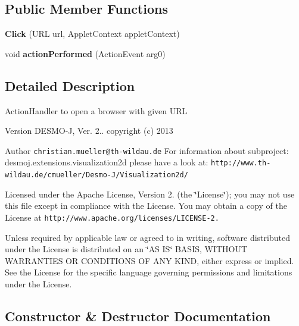 \subsection*{Public Member Functions}
\begin{DoxyCompactItemize}
\item 
{\bf Click} (U\-R\-L url, Applet\-Context applet\-Context)
\item 
void {\bfseries action\-Performed} (Action\-Event arg0)\label{classdesmoj_1_1extensions_1_1visualization2d_1_1engine_1_1viewer_1_1_click_a00d973782b0739bbaf78a3f8e36f4a82}

\end{DoxyCompactItemize}


\subsection{Detailed Description}
Action\-Handler to open a browser with given U\-R\-L

\begin{DoxyVersion}{Version}
D\-E\-S\-M\-O-\/\-J, Ver. 2.. copyright (c) 2013 
\end{DoxyVersion}
\begin{DoxyAuthor}{Author}
{\tt christian.\-mueller@th-\/wildau.\-de} For information about subproject\-: desmoj.\-extensions.\-visualization2d please have a look at\-: {\tt http\-://www.\-th-\/wildau.\-de/cmueller/\-Desmo-\/\-J/\-Visualization2d/}
\end{DoxyAuthor}
Licensed under the Apache License, Version 2. (the \char`\"{}\-License\char`\"{}); you may not use this file except in compliance with the License. You may obtain a copy of the License at {\tt http\-://www.\-apache.\-org/licenses/\-L\-I\-C\-E\-N\-S\-E-\/2.}

Unless required by applicable law or agreed to in writing, software distributed under the License is distributed on an \char`\"{}\-A\-S I\-S\char`\"{} B\-A\-S\-I\-S, W\-I\-T\-H\-O\-U\-T W\-A\-R\-R\-A\-N\-T\-I\-E\-S O\-R C\-O\-N\-D\-I\-T\-I\-O\-N\-S O\-F A\-N\-Y K\-I\-N\-D, either express or implied. See the License for the specific language governing permissions and limitations under the License. 

\subsection{Constructor \& Destructor Documentation}
